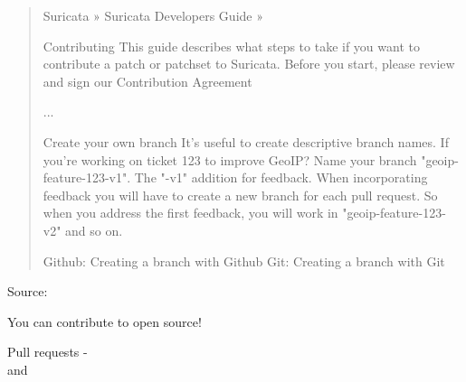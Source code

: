 \documentclass[Screen16to9,17pt]{foils}
\begin{document}

\begin{quote}\small
Suricata » Suricata Developers Guide »

Contributing
This guide describes what steps to take if you want to contribute a patch or patchset to Suricata.
Before you start, please review and sign our Contribution Agreement

...

Create your own branch
It's useful to create descriptive branch names. If you're working on ticket 123 to improve GeoIP? Name your branch "geoip-feature-123-v1". The "-v1" addition for feedback. When incorporating feedback you will have to create a new branch for each pull request. So when you address the first feedback, you will work in "geoip-feature-123-v2" and so on.

Github: Creating a branch with Github
Git: Creating a branch with Git
\end{quote}


Source: 

\begin{list2}
\item You can contribute to open source!
\item Pull requests - \\
 and 
\end{list2}





\begin{center}
\hlkbig

\myname

\end{center}
\end{document}

